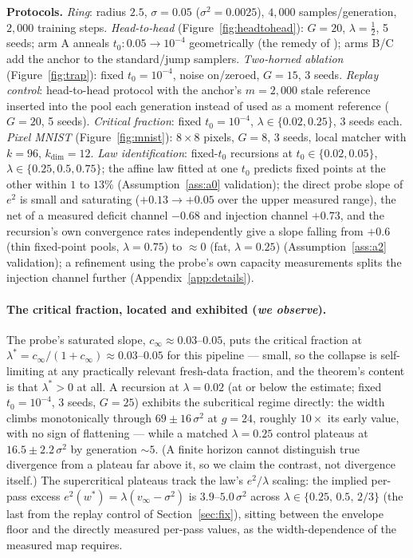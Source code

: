 \documentclass[11pt]{article}
\theoremstyle{remark}
\newcommand{\sigsq}{\sigma^2}
\begin{document}
\textbf{Protocols.} \emph{Ring}: radius $2.5$, $\sigma=0.05$ ($\sigsq=0.0025$), $4{,}000$
samples/generation, $2{,}000$ training steps. \emph{Head-to-head}
(Figure~\ref{fig:headtohead}): $G=20$, $\lambda=\tfrac12$, 5 seeds; arm A anneals
$t_0\!:0.05\to10^{-4}$ geometrically (the remedy of \citealp{khelifa2026recursive});
arms B/C add the anchor to the standard/jump samplers. \emph{Two-horned ablation}
(Figure~\ref{fig:trap}): fixed $t_0=10^{-4}$, noise on/zeroed, $G=15$, 3 seeds.
\emph{Replay control}: head-to-head protocol with the anchor's $m{=}2{,}000$ stale
reference inserted into the pool each generation instead of used as a moment reference
($G=20$, 5 seeds). \emph{Critical fraction}: fixed $t_0=10^{-4}$,
$\lambda\in\{0.02,0.25\}$, 3 seeds each. \emph{Pixel MNIST} (Figure~\ref{fig:mnist}):
$8\times8$ pixels, $G=8$, 3 seeds,
local matcher with $k=96$, $k_{\dim}=12$. \emph{Law identification}: fixed-$t_0$
recursions at $t_0\in\{0.02,0.05\}$, $\lambda\in\{0.25,0.5,0.75\}$; the affine law
fitted at one $t_0$ predicts fixed points at the other within $1$ to $13\%$
(Assumption~\ref{ass:a0} validation); the direct probe slope of $e^2$ is small and
saturating ($+0.13\to+0.05$ over the upper measured range), the net of a measured
deficit channel $-0.68$ and injection channel $+0.73$, and the recursion's own
convergence rates independently give a slope falling from $+0.6$ (thin fixed-point
pools, $\lambda=0.75$) to $\approx0$ (fat, $\lambda=0.25$)
(Assumption~\ref{ass:a2} validation); a refinement using the
probe's own capacity measurements splits the injection channel further
(Appendix~\ref{app:details}).

\paragraph{The critical fraction, located and exhibited (\emph{we observe}).} The
probe's saturated slope, $c_\infty\approx0.03$--$0.05$, puts the critical fraction at
$\lambda^*=c_\infty/(1+c_\infty)\approx0.03$--$0.05$ for this pipeline --- small, so the
collapse is self-limiting at any practically relevant fresh-data fraction, and the
theorem's content is that $\lambda^*>0$ at all. A recursion at $\lambda=0.02$ (at or
below the estimate; fixed $t_0=10^{-4}$, 3 seeds, $G=25$) exhibits the subcritical
regime directly: the width climbs monotonically through $69\pm16\,\sigsq$ at $g=24$,
roughly $10\times$ its early value, with no sign of flattening --- while a matched
$\lambda=0.25$ control plateaus at $16.5\pm2.2\,\sigsq$ by generation ${\sim}5$. (A
finite horizon cannot distinguish true divergence from a plateau far above it, so we
claim the contrast, not divergence itself.) The supercritical plateaus track the law's
$e^2/\lambda$ scaling: the implied per-pass excess $e^2(w^*)=\lambda(v_\infty-\sigsq)$
is $3.9$--$5.0\,\sigsq$ across $\lambda\in\{0.25,\,0.5,\,2/3\}$ (the last from the
replay control of Section~\ref{sec:fix}), sitting between the envelope floor and the
directly measured per-pass values, as the width-dependence of the measured map
requires.
\end{document}

